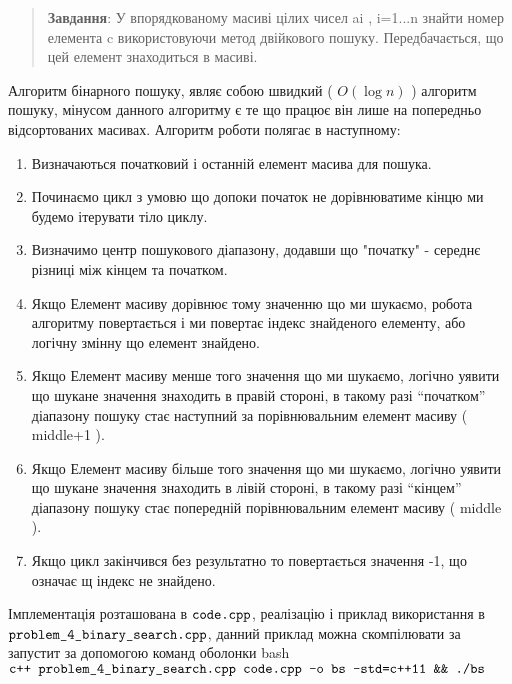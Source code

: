 \begin{center}
  \Large{}
\end{center}

\begin{quote} \textbf{Завдання}: У впорядкованому масиві цілих чисел ai , i=1...n знайти номер елемента c використовуючи метод двійкового пошуку. Передбачається, що цей елемент знаходиться в масиві.
\end{quote}

Алгоритм бінарного пошуку, являє собою швидкий ( $O(\log{n})$ ) алгоритм пошуку, мінусом данного алгоритму є те що працює він лише на попередньо відсортованих масивах. Алгоритм роботи полягає в наступному:
\begin{enumerate}
  \item Визначаються початковий і останній елемент масива для пошука.
  \item Починаємо цикл з умовю що допоки початок не дорівнюватиме кінцю ми будемо ітерувати тіло циклу.
  \item Визначимо центр пошукового діапазону, додавши що "початку" - середнє різниці між кінцем та початком.
  \item Якщо Елемент масиву дорівнює тому значенню що ми шукаємо, робота алгоритму повертається і ми повертає індекс знайденого елементу, або логічну змінну що елемент знайдено.
  \item Якщо Елемент масиву менше того значення що ми шукаємо, логічно уявити що  шукане значення знаходить в правій стороні, в такому разі ``початком'' діапазону пошуку стає наступний за порівнювальним елемент масиву ( middle+1 ).
  \item Якщо Елемент масиву більше того значення що ми шукаємо, логічно уявити що  шукане значення знаходить в лівій стороні, в такому разі ``кінцем'' діапазону пошуку стає попередній порівнювальним елемент масиву ( middle ).
  \item Якщо цикл закінчився без результатно то повертається значення -1, що означає щ індекс не знайдено.
\end{enumerate}


Імплементація розташована в  $\normalsize\texttt{code.cpp}$, реалізацію і приклад використання в $\normalsize\texttt{problem\_4\_binary\_search.cpp}$, данний приклад можна скомпілювати за запустит за допомогою команд оболонки bash \\  $\normalsize\texttt{c++ problem\_4\_binary\_search.cpp code.cpp -o bs -std=c++11 \&\& ./bs}$
